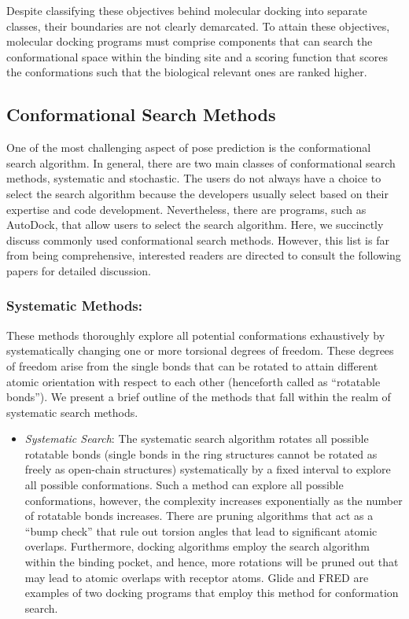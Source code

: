 \documentclass[10pt,letterpaper]{article}
\begin{document}
{Despite classifying these objectives behind molecular docking into separate classes, their boundaries are not clearly demarcated. To attain these objectives, molecular docking programs must comprise components that can search the conformational space within the binding site and a scoring function that scores the conformations such that the biological relevant ones are ranked higher.


{\subsection*{Conformational Search Methods}
One of the most challenging aspect of pose prediction is the conformational search algorithm. In general, there are two main classes of conformational search methods, systematic and stochastic.  The users do not always have a choice to select the search algorithm because the developers usually select based on their expertise and code development. Nevertheless, there are programs, such as AutoDock\cite{bib22}, that allow users to select the search algorithm. Here, we succinctly discuss commonly used conformational search methods. However, this list is far from being comprehensive, interested readers are directed to consult the following papers for detailed discussion\cite{bib17, bib23}. 

\subsubsection*{Systematic Methods:}
These methods thoroughly explore all potential conformations exhaustively by systematically changing one or more torsional degrees of freedom. These degrees of freedom arise from the single bonds that can be rotated to attain different atomic orientation with respect to each other (henceforth called as “rotatable bonds”).  We present a brief outline of the methods that fall within the realm of systematic search methods.  
\begin{itemize}
    \item \textit{Systematic Search}: The systematic search algorithm\cite{bib14} rotates all possible rotatable bonds (single bonds in the ring structures cannot be rotated as freely as open-chain structures) systematically by a fixed interval to explore all possible conformations. Such a method can explore all possible conformations, however, the complexity increases exponentially as the number of rotatable bonds increases. There are pruning algorithms that act as a “bump check” that rule out torsion angles that lead to significant atomic overlaps. Furthermore, docking algorithms employ the search algorithm within the binding pocket, and hence, more rotations will be pruned out that 
    may lead to atomic overlaps with receptor atoms. Glide\cite{bib15} and FRED\cite{bib16} are examples of two docking programs that employ this method for conformation search. 


\end{itemize}}}
\end{document}
